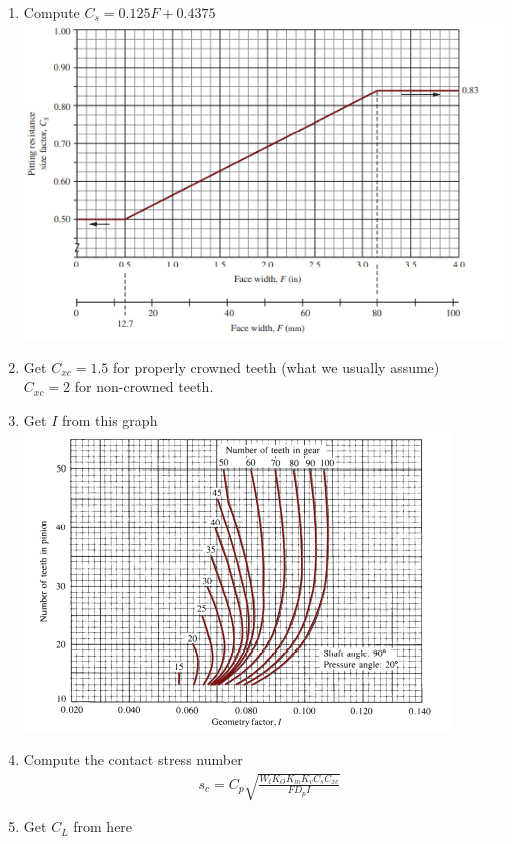 \documentclass[11pt, fleqn]{article}
\begin{document}
\begin{enumerate}
    \item Compute $C_s=0.125F+0.4375$\\
    \includegraphics[scale=1]{Gears/Fig 10-18.png}
    \item Get $C_{xc}=1.5$ for properly crowned teeth (what we usually assume)\\
    $C_{xc}=2$ for non-crowned teeth.
    \item Get $I$ from this graph\\
    \includegraphics[scale=1]{Gears/Fig 10-19.png}
    \item Compute the contact stress number
    \begin{align*}
        &s_c=C_p\sqrt{\frac{W_tK_OK_mK_vC_sC_{xc}}{FD_pI}}
    \end{align*}
    \item Get $C_L$ from here\\

\end{enumerate}
\end{document}
